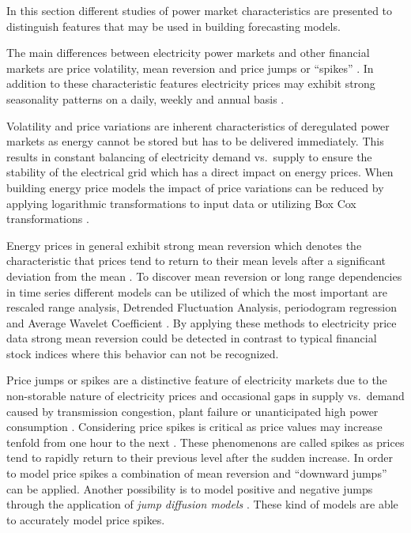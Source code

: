 In this section different studies of power market characteristics are presented to distinguish features that may be used in building forecasting models. 


The main differences between electricity power markets and other financial markets are price volatility, mean reversion and price jumps or "`spikes"' \cite{weron2007modeling,weron2008market,weron2004modelingmarkets}. In addition to these characteristic features electricity prices may exhibit strong seasonality patterns on a daily, weekly and annual basis \cite{weron2004modelingmarkets}. 

Volatility and price variations are inherent characteristics of deregulated power markets as energy cannot be stored but has to be delivered immediately. This results in constant balancing of electricity demand vs.~supply to ensure the stability of the electrical grid which has a direct impact on energy prices. When building energy price models the impact of price variations can be reduced by applying logarithmic transformations to input data or utilizing Box Cox transformations \cite{weron2005forecasting, box1964analysis}. 


Energy prices in general exhibit strong mean reversion which denotes the characteristic that prices tend to return to their mean levels after a significant deviation from the mean \cite{weron2004modelingmarkets,weron2007modeling}. To discover mean reversion or long range dependencies in time series different models can be utilized of which the most important are rescaled range analysis, Detrended Fluctuation Analysis, periodogram regression and Average Wavelet Coefficient \cite{weron2007modeling}. By applying these methods to electricity price data strong mean reversion could be detected in contrast to typical financial stock indices where this behavior can not be recognized. 


Price jumps or spikes are a distinctive feature of electricity markets due to the non-storable nature of electricity prices and occasional gaps in supply vs.~demand caused by transmission congestion, plant failure or unanticipated high power consumption \cite{weron2004modelingmarkets, weron2007modeling}. 
Considering price spikes is critical as price values may increase tenfold from one hour to the next \cite{huisman2007hourly}. 
These phenomenons are called spikes as prices tend to rapidly return to their previous level after the sudden increase. In order to model price spikes a combination of mean reversion and "`downward jumps"' can be applied. Another possibility is to model positive and negative jumps through the application of \textit{jump diffusion models} \cite{weron2004modeling}. These kind of models are able to accurately model price spikes. 

